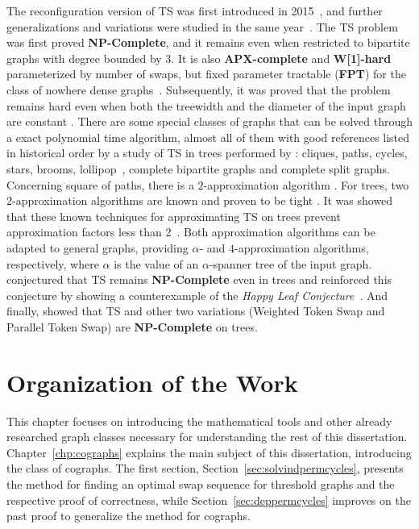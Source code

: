 \documentclass[msc]{ppgccufmg}    %
\begin{document}
The reconfiguration version of TS was first introduced in 2015~\citep{
Yamanaka:2015}, and further generalizations and variations were studied in the 
same year~\citep{Yamanaka:Colored:2015}.
The TS problem was first proved \textbf{NP-Complete}, and it remains 
even when restricted to bipartite graphs with degree bounded by 3. 
It is also \textbf{APX-complete} and \textbf{W[1]-hard} parameterized by number of swaps, 
but fixed parameter tractable (\textbf{FPT}) for the class of nowhere dense
graphs~\citep{Kawahara:2017,Miltzow:2016}.
Subsequently, it was proved that the problem remains hard even when both the 
treewidth and the diameter of the input graph are constant \citep{Bonnet:2018}.
There are some special classes of graphs that can be solved through a
exact polynomial time algorithm, almost all of them with good references 
listed in historical order by a study of TS in trees performed by 
\citep{Ahmad:2019}: cliques, paths, cycles, stars, brooms, 
lollipop~\citep{Kawahara:2017}, complete bipartite graphs and complete split 
graphs.
Concerning square of paths, there is a $2$-approximation algorithm 
\citep{Lenwood:2003}.
For trees, two $2$-approximation algorithms \citep{Yamanaka:2015,Miltzow:2016} 
are known and proven to be tight \citep{Ahmad:2019}.
It was showed that these known techniques for approximating TS on trees
prevent approximation factors less than 2~\citep{Oswin:2021}.
Both approximation algorithms can be adapted to general graphs, providing 
$\alpha$- and $4$-approximation algorithms, respectively, where $\alpha$ is the 
value of an $\alpha$-spanner tree of the input graph.
\cite{Bonnet:2018} conjectured that TS remains \textbf{NP-Complete}
even in trees and \cite{Ahmad:2019} reinforced this conjecture by showing a 
counterexample of the \textit{Happy Leaf Conjecture}~\citep{Vaughan:1991}.
And finally, \cite{Oswin:2021} showed that TS and other two variations (Weighted 
Token Swap and Parallel Token Swap) are \textbf{NP-Complete} on trees.

\section{Organization of the Work}
\label{sec:intro:organi}

This chapter focuses on introducing the mathematical tools and other 
already researched graph classes necessary for understanding the rest of this 
dissertation.
Chapter~\ref{chp:cographs} explains the main subject of this dissertation,
introducing the class of cographs.
The first section, Section~\ref{sec:solvindpermcycles}, presents the method 
for finding an optimal swap sequence for threshold graphs and the respective proof
of correctness, while Section~\ref{sec:deppermcycles} improves on the past 
proof to generalize the method for cographs.
\end{document}
